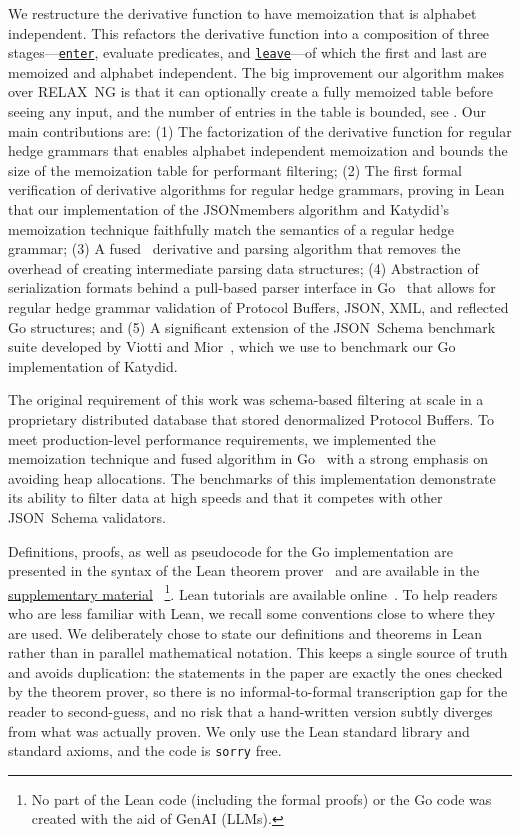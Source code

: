 \documentclass[runningheads]{llncs}
\newcommand{\link}[2]{\mbox{\hyperref[#2]{\lstinline{#1}}}\xspace}
\newcommand{\enter}{\link{enter}{def enter}}
\newcommand{\leave}{\link{leave}{def leave}}
\newcommand{\RelaxNG}{%
  RELAX~NG\xspace%
}
\newcommand{\JSONSchema}{%
  JSON~Schema\xspace%
}
\newcommand{\supplementarymaterial}{%
  \hyperref[supplementary_material]{supplementary material}\xspace%
}
\newcommand{\JSON}{\ac{JSON}\xspace}
\newcommand{\XML}{\ac{XML}\xspace}
\begin{document}
We restructure the derivative function to have memoization that is alphabet independent.
This refactors the derivative function into a composition of three stages—\enter, evaluate predicates, and \leave—of which the first and last are memoized and alphabet independent.
The big improvement our algorithm makes over \RelaxNG is that it can optionally create a fully memoized table before seeing any input, and the number of entries in the table is bounded, see .
Our main contributions are:
(1) The factorization of the derivative function for regular hedge grammars that enables alphabet independent memoization and bounds the size of the memoization table for performant filtering;
(2) The first formal verification of derivative algorithms for regular hedge grammars, proving in Lean~\cite{lean4} that our implementation of the JSONmembers algorithm and Katydid's memoization technique faithfully match the semantics of a regular hedge grammar;
(3) A fused~\cite{fusion} derivative and parsing algorithm that removes the overhead of creating intermediate parsing data structures;
(4) Abstraction of serialization formats behind a pull-based parser interface in Go~\cite{golang} that allows for regular hedge grammar validation of Protocol Buffers, \JSON, \XML, and reflected Go structures; and
(5) A significant extension of the \JSONSchema benchmark suite developed by Viotti and Mior~\cite{blaze}, which we use to benchmark our Go implementation of Katydid.

The original requirement of this work was schema-based filtering at scale in a proprietary distributed database that stored denormalized Protocol Buffers.
To meet production-level performance requirements, we implemented the memoization technique and fused algorithm in Go~\cite{golang} with a strong emphasis on avoiding heap allocations.
The benchmarks of this implementation demonstrate its ability to filter data at high speeds and that it competes with other \JSONSchema validators.

Definitions, proofs, as well as pseudocode for the Go implementation are presented in the syntax of the Lean theorem prover~\cite{lean4} and are available in the \supplementarymaterial~\footnote{No part of the Lean code (including the formal proofs) or the Go code was created with the aid of GenAI (LLMs).}.
Lean tutorials are available online~\cite{learnlean}.
To help readers who are less familiar with Lean, we recall some conventions close to where they are used.
We deliberately chose to state our definitions and theorems in Lean rather than in parallel mathematical notation.
This keeps a single source of truth and avoids duplication: the statements in the paper are exactly the ones checked by the theorem prover, so there is no informal-to-formal transcription gap for the reader to second-guess, and no risk that a hand-written version subtly diverges from what was actually proven.
We only use the Lean standard library and standard axioms, and the code is \lstinline{sorry} free.
\end{document}

